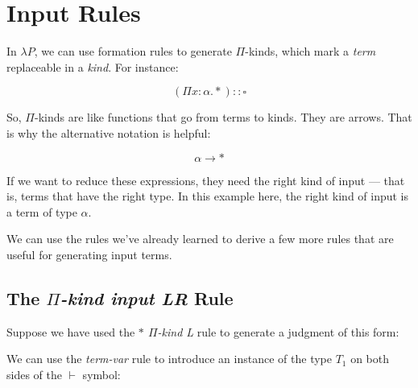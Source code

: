 \documentclass{book}
\numberwithin{equation}{chapter}
\begin{document}
\chapter{Input Rules}

In $\lambda P$, we can use formation rules to generate $\Pi$-kinds, which mark a \textit{term} replaceable in a \textit{kind}. For instance:

\begin{equation}
(\Pi x : \alpha.\ast) :: \square
\end{equation}

\noindent
So, $\Pi$-kinds are like functions that go from terms to kinds. They are arrows. That is why the alternative notation is helpful:

\begin{equation}
\alpha \rightarrow \ast
\end{equation}

\noindent
If we want to reduce these expressions, they need the right kind of input --- that is, terms that have the right type. In this example here, the right kind of input is a term of type $\alpha$.

We can use the rules we've already learned to derive a few more rules that are useful for generating input terms.


\section{The \textit{$\Pi$-kind input LR} Rule}

Suppose we have used the \textit{$\ast$ $\Pi$-kind L} rule to generate a judgment of this form:

\begin{prooftree}
\end{prooftree}

\noindent
We can use the \textit{term-var} rule to introduce an instance of the type $T_{1}$ on both sides of the $\vdash$ symbol:

\begin{prooftree}
\end{prooftree}
\end{document}
